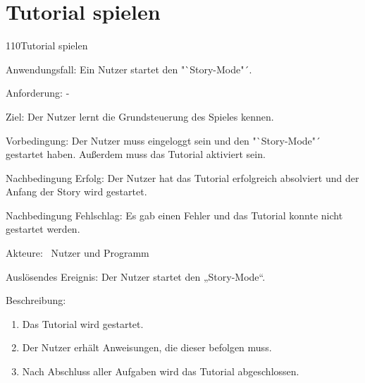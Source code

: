 \section{Tutorial spielen}
\begin{function}{110}{Tutorial spielen}
\item[Anwendungsfall:] Ein Nutzer startet den "`Story-Mode"´.
\item[Anforderung:] -
\item[Ziel:] Der Nutzer lernt die Grundsteuerung des Spieles kennen.
\item[Vorbedingung:] Der Nutzer muss eingeloggt sein und den "`Story-Mode"´ gestartet haben. Außerdem muss das Tutorial aktiviert sein.
\item[Nachbedingung Erfolg:]  Der Nutzer hat das Tutorial erfolgreich absolviert und der Anfang der Story wird gestartet.
\item[Nachbedingung Fehlschlag:] Es gab einen Fehler und das Tutorial konnte nicht gestartet werden.
\item[Akteure:] ~Nutzer und Programm
\item[Auslösendes Ereignis:] Der Nutzer startet den „Story-Mode“.
\item[Beschreibung:] ~
\begin{enumerate}
  \item  Das Tutorial wird gestartet.
  \item  Der Nutzer erhält Anweisungen, die dieser befolgen muss.
  \item Nach Abschluss aller Aufgaben wird das Tutorial abgeschlossen.
\end{enumerate}
\end{function}

